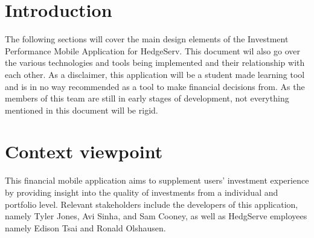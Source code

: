 \documentclass[onecolumn, draftclsnofoot,10pt, compsoc]{IEEEtran}
\begin{document}
\section{Introduction}

    The following sections will cover the main design elements of the Investment Performance Mobile
    Application for HedgeServ. This document wil also go over the various technologies and tools being implemented and their
    relationship with each other. As a disclaimer, this application will be a student made learning tool and is in
    no way recommended as a tool  to make financial decisions from. As the members of this team are still in early stages of development,
    not everything mentioned in this document will be rigid. 
      


\section{Context viewpoint}
        This financial mobile application aims to supplement users' investment experience by providing insight into the quality of investments from a individual and portfolio level.
        Relevant stakeholders include the developers of this application, namely Tyler Jones, Avi Sinha, and Sam Cooney, as well as HedgServe employees namely Edison Tsai and Ronald Olshausen.
\end{document}
